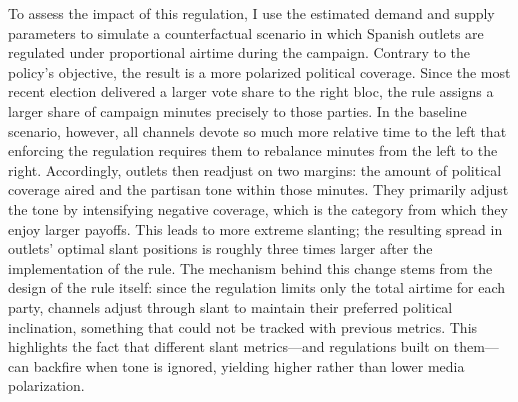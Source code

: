 \documentclass[12pt]{article}
\begin{document}
To assess the impact of this regulation, I use the estimated demand and supply parameters to simulate a counterfactual scenario in which Spanish outlets are regulated under proportional airtime during the campaign. Contrary to the policy's objective, the result is a more polarized political coverage. Since the most recent election delivered a larger vote share to the right bloc, the rule assigns a larger share of campaign minutes precisely to those parties. In the baseline scenario, however,  all channels devote so much more relative time to the left that enforcing the regulation requires them to rebalance minutes from the left to the right. Accordingly, outlets then readjust on two margins:  the amount of political coverage  aired and the partisan tone within those minutes. They primarily adjust the tone  by intensifying negative coverage, which is the category from which they enjoy larger payoffs. This leads to more extreme slanting; the resulting spread in outlets’ optimal slant positions is roughly three times larger after the implementation of the rule. The mechanism behind this change stems from the design of the rule itself: since the regulation limits only the total airtime for each party, channels adjust through slant to maintain their preferred political inclination, something that could not be tracked with previous metrics.  This highlights the fact that different slant metrics—and regulations built on them—can backfire when tone is ignored, yielding higher rather than lower media polarization.
\end{document}

